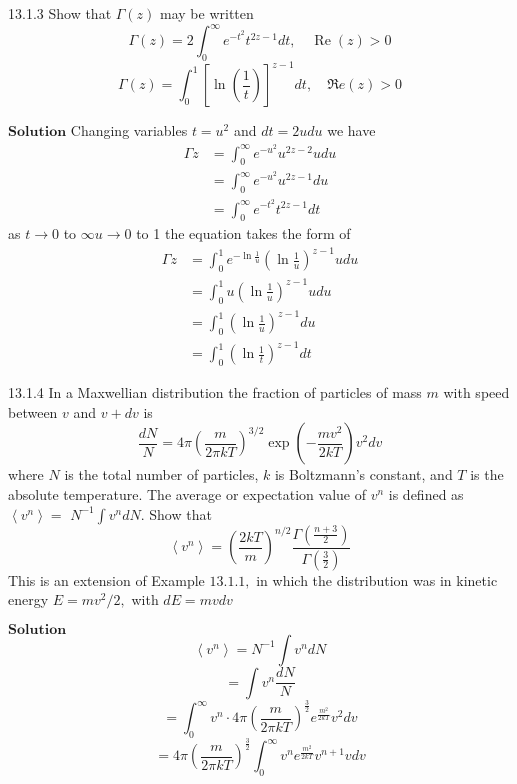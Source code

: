 \documentclass{article}
\begin{document}
\begin{flushleft}
\begin{mybox}{13.1.3}
Show that $\Gamma(z)$ may be written
$$\Gamma(z)=2 \int_{0}^{\infty} e^{-t^{2}} t^{2 z-1} d t, \quad \operatorname{Re}(z)>0$$
$$\Gamma(z)=\int_{0}^{1}\left[\ln \left(\frac{1}{t}\right)\right]^{z-1} d t, \quad \Re e(z)>0$$
\end{mybox}
$\boxed{\textbf{Solution}}$ Changing variables $t=u^{2}$ and $d t=2 u d u$ we have
$$
\begin{aligned}
\Gamma z &=\int_{0}^{\infty} e^{-u^{2}} u^{2 z-2} u d u \\
&=\int_{0}^{\infty} e^{-u^{2}} u^{2 z-1} d u \\
&=\int_{0}^{\infty} e^{-t^{2}} t^{2 z-1} d t
\end{aligned}
$$
as $t \rightarrow 0$ to $\infty u \rightarrow 0$ to 1 the equation takes the form of 
$$
\begin{aligned}
\Gamma z &=\int_{0}^{1} e^{-\ln \frac{1}{u}}\left(\ln \frac{1}{u}\right)^{z-1} u d u \\
&=\int_{0}^{1} u\left(\ln \frac{1}{u}\right)^{z-1} u d u \\
&=\int_{0}^{1}\left(\ln \frac{1}{u}\right)^{z-1} d u \\
&=\int_{0}^{1}\left(\ln \frac{1}{t}\right)^{z-1} d t
\end{aligned}
$$

\newpage

\begin{mybox}{13.1.4}
In a Maxwellian distribution the fraction of particles of mass $m$ with speed between $v$ and $v+d v$ is
$$
\frac{d N}{N}=4 \pi\left(\frac{m}{2 \pi k T}\right)^{3 / 2} \exp \left(-\frac{m v^{2}}{2 k T}\right) v^{2} d v
$$
where $N$ is the total number of particles, $k$ is Boltzmann's constant, and $T$ is the absolute temperature. The average or expectation value of $v^{n}$ is defined as $\left\langle v^{n}\right\rangle=$ $N^{-1} \int v^{n} d N .$ Show that
$$
\left\langle v^{n}\right\rangle=\left(\frac{2 k T}{m}\right)^{n / 2} \frac{\Gamma\left(\frac{n+3}{2}\right)}{\Gamma\left(\frac{3}{2}\right)}
$$
This is an extension of Example $13.1 .1,$ in which the distribution was in kinetic energy $E=m v^{2} / 2,$ with $d E=m v d v$
\end{mybox}
$\boxed{\textbf{Solution}}$ 
$$\left\langle v^{n}\right\rangle=N^{-1} \int v^{n} d N$$
$$=\int v^{n} \frac{d N}{N}$$
$$=\int_{0}^{\infty} v^{n} \cdot 4 \pi\left(\frac{m}{2 \pi k T}\right)^{\frac{3}{2}} e^{\frac{m^{2}}{2 k T}} v^{2} d v$$
$$=4 \pi\left(\frac{m}{2 \pi k T}\right)^{\frac{3}{2}} \int_{0}^{\infty} v^{n} e^{\frac{m^{2}}{2 k T}} v^{n+1} v d v$$


\end{flushleft}
\end{document}
